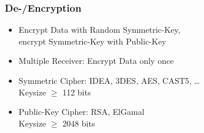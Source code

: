 \documentclass{beamer}
\begin{document}
\begin{frame}

	\frametitle{De-/Encryption}


	\begin{itemize}
		\item Encrypt Data with Random Symmetric-Key,\\ encrypt Symmetric-Key with Public-Key
		\item Multiple Receiver: Encrypt Data only once 
	\end{itemize}
		
	\begin{itemize}
		\item Symmetric Cipher: IDEA, 3DES, AES, CAST5, \ldots  \\
				\small Keysize $\geq$ 112 bits \cite{nist} 
		\item Public-Key Cipher: RSA, ElGamal \\
				\small Keysize $\geq$ 2048 bits \cite{nist} 
	\end{itemize}

\end{frame}

\end{document}
